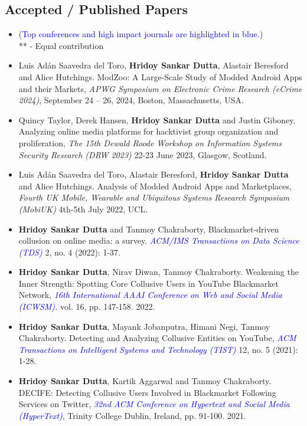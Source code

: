 \documentclass[margin, centered,lmodern]{res}
\begin{document}
\begin{resume}
\section{Accepted / Published Papers}
\begin{itemize}[leftmargin=*]
\item[] (\textcolor{blue}{Top conferences and high impact journals are highlighted in blue.}) \\ ** - Equal contribution

\item Luis Adán Saavedra del Toro,  \textbf{Hridoy Sankar Dutta}, Alastair Beresford and Alice Hutchings.  ModZoo: A Large-Scale Study of Modded Android Apps and their Markets,  \textit{APWG Symposium on Electronic Crime Research (eCrime 2024)}, September 24 – 26, 2024, Boston, Massachusetts, USA.
\item Quincy Taylor,  Derek Hansen,  \textbf{Hridoy Sankar Dutta} and Justin Giboney. Analyzing online media platforms for hacktivist group organization and proliferation,  \textit{The 15th Dewald Roode Workshop on Information Systems Security Research (DRW 2023)} 22-23 June 2023, Glasgow, Scotland.

\item Luis Adán Saavedra del Toro,  Alastair Beresford,  \textbf{Hridoy Sankar Dutta} and Alice Hutchings. Analysis of Modded Android Apps and Marketplaces,  \textit{Fourth UK Mobile, Wearable and Ubiquitous Systems Research Symposium (MobiUK)} 4th-5th July 2022, UCL.

\item \textbf{Hridoy Sankar Dutta} and Tanmoy Chakraborty, Blackmarket-driven collusion on online media: a survey.  \textit{\textcolor{blue}{ACM/IMS Transactions on Data Science (TDS)}} 2, no. 4 (2022): 1-37.

\item \textbf{Hridoy Sankar Dutta}, Nirav Diwan, Tanmoy Chakraborty. Weakening the Inner Strength: Spotting Core Collusive Users in YouTube Blackmarket Network,  \textit{\textcolor{blue}{16th International AAAI Conference on Web and Social Media (ICWSM)}.}  vol. 16, pp. 147-158. 2022.

\item \textbf{Hridoy Sankar Dutta}, Mayank Jobanputra, Himani Negi, Tanmoy Chakraborty. Detecting and Analyzing Collusive Entities on YouTube,   \textit{\textcolor{blue}{ACM Transactions on Intelligent Systems and Technology (TIST)}} 12, no. 5 (2021): 1-28.

\item \textbf{Hridoy Sankar Dutta}, Kartik Aggarwal and Tanmoy Chakraborty. DECIFE: Detecting Collusive Users Involved in Blackmarket Following Services on Twitter, \textit{\textcolor{blue}{32nd ACM Conference on Hypertext and Social Media (HyperText)}}, Trinity College Dublin, Ireland,  pp. 91-100. 2021.


\end{itemize}
\end{resume}
\end{document}
